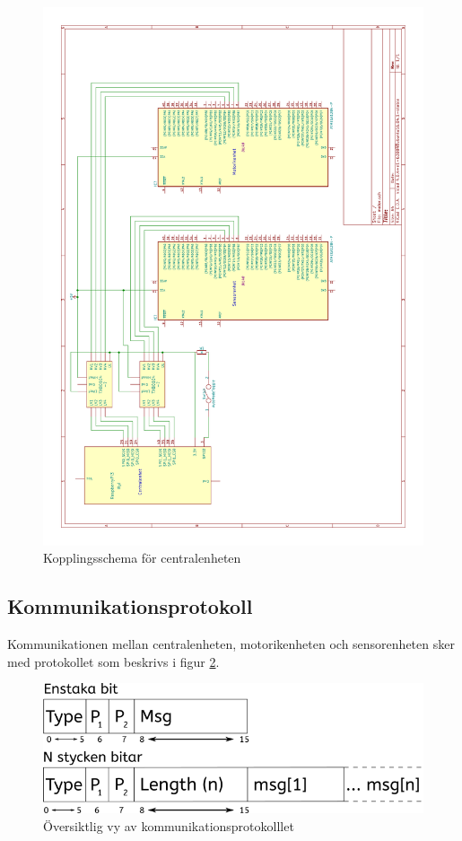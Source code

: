 \documentclass[a4paper,titlepage,12pt]{article}
\begin{document}
	\begin{figure}[htpb]
		\centering
		\includegraphics[width=1.0\linewidth]{charts/central/centralenhet.pdf}
		\caption{Kopplingsschema för centralenheten}
		\label{fig:central_circuit}
	\end{figure}




	\subsection{Kommunikationsprotokoll}
	\label{ssub:Kommunikationsprotokoll}
	Kommunikationen mellan centralenheten, motorikenheten och sensorenheten sker 
	med protokollet som beskrivs i figur \ref{fig:kommunikation1}.

	\newpage
	\begin{figure}[h!]
		\centering
		\includegraphics[width=0.5\linewidth]{images/communication_protocol1.png}
		\caption{Översiktlig vy av kommunikationsprotokolllet}
		\label{fig:kommunikation1}
	\end{figure}
\end{document}
